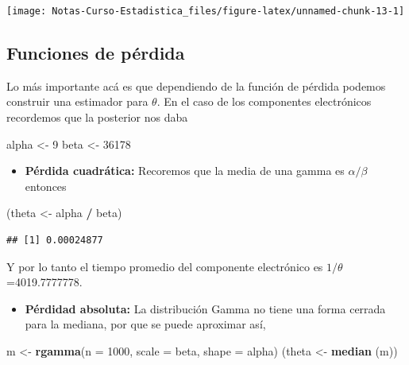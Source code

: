 \documentclass[
  12pt,
]{book}
\newenvironment{Shaded}{\begin{snugshade}}{\end{snugshade}}
\newcommand{\DataTypeTok}[1]{\textcolor[rgb]{0.13,0.29,0.53}{#1}}
\newcommand{\DecValTok}[1]{\textcolor[rgb]{0.00,0.00,0.81}{#1}}
\newcommand{\KeywordTok}[1]{\textcolor[rgb]{0.13,0.29,0.53}{\textbf{#1}}}
\newcommand{\NormalTok}[1]{#1}
\newcommand{\OperatorTok}[1]{\textcolor[rgb]{0.81,0.36,0.00}{\textbf{#1}}}
\newcommand{\StringTok}[1]{\textcolor[rgb]{0.31,0.60,0.02}{#1}}
\providecommand{\tightlist}{%
  \setlength{\itemsep}{0pt}\setlength{\parskip}{0pt}}
\begin{document}
\begin{center}\texttt{[image: Notas-Curso-Estadistica\_files/figure-latex/unnamed-chunk-13-1]} \end{center}

\hypertarget{funciones-de-puxe9rdida-1}{%
\subsection{Funciones de pérdida}\label{funciones-de-puxe9rdida-1}}

Lo más importante acá es que dependiendo de la función de pérdida podemos construir una estimador para \(\theta\). En el caso de los componentes electrónicos recordemos que la posterior nos daba

\begin{Shaded}
\begin{Highlighting}[]
\NormalTok{alpha \textless{}{-}}\StringTok{ }\DecValTok{9}
\NormalTok{beta \textless{}{-}}\StringTok{ }\DecValTok{36178}
\end{Highlighting}
\end{Shaded}

\begin{itemize}
\tightlist
\item
  \textbf{Pérdida cuadrática:} Recoremos que la media de una gamma es \(\alpha/\beta\) entonces
\end{itemize}

\begin{Shaded}
\begin{Highlighting}[]
\NormalTok{(theta \textless{}{-}}\StringTok{ }\NormalTok{alpha }\OperatorTok{/}\StringTok{ }\NormalTok{beta)}
\end{Highlighting}
\end{Shaded}

\begin{verbatim}
## [1] 0.00024877
\end{verbatim}

Y por lo tanto el tiempo promedio del componente electrónico es \(1/\theta\)=4019.7777778.

\begin{itemize}
\tightlist
\item
  \textbf{Pérdidad absoluta:} La distribución Gamma no tiene una forma cerrada para la mediana, por que se puede aproximar así,
\end{itemize}

\begin{Shaded}
\begin{Highlighting}[]
\NormalTok{m \textless{}{-}}\StringTok{ }\KeywordTok{rgamma}\NormalTok{(}\DataTypeTok{n =} \DecValTok{1000}\NormalTok{, }\DataTypeTok{scale =}\NormalTok{ beta, }\DataTypeTok{shape =}\NormalTok{ alpha)}
\NormalTok{(theta \textless{}{-}}\StringTok{ }\KeywordTok{median}\NormalTok{ (m))}
\end{Highlighting}
\end{Shaded}
\end{document}
